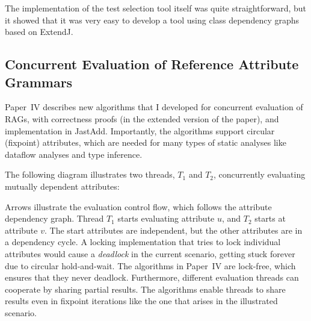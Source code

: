 \documentclass[10pt, twoside, openright]{book}
\begin{document}
The implementation of the test selection tool itself was quite straightforward, but it showed
that it was very easy to develop a tool using class dependency graphs based on ExtendJ.


\subsection[Concurrent Evaluation of Reference Attribute Grammars]{\texorpdfstring{%
Concurrent Evaluation of Reference Attribute Grammars}{%
Concurrent Evaluation of Reference Attribute Grammars}}
\label{sec:contrib-parallel}

Paper~IV describes new algorithms that I developed for concurrent evaluation of RAGs,
with correctness proofs (in the extended version of the paper), and implementation in JastAdd.
Importantly, the algorithms support circular (fixpoint) attributes, which are
needed for many types of static analyses like dataflow analyses and type
inference.

The following diagram illustrates two threads, $T_1$ and $T_2$, concurrently
evaluating mutually dependent attributes:

\begin{center}
\end{center}

\noindent
Arrows illustrate the evaluation control flow, which follows the attribute dependency graph.
Thread $T_1$ starts evaluating attribute $u$, and $T_2$ starts at attribute $v$. The
start attributes are independent, but the other attributes are in a dependency cycle.
A locking implementation that tries to lock individual attributes would cause a \emph{deadlock} in
the current scenario, getting stuck forever due to circular hold-and-wait.
The algorithms in Paper~IV are lock-free, which ensures that they never deadlock.
Furthermore, different evaluation threads can cooperate by sharing partial results. The algorithms
enable threads to share results even in fixpoint iterations like the one that
arises in the illustrated scenario.
\end{document}
